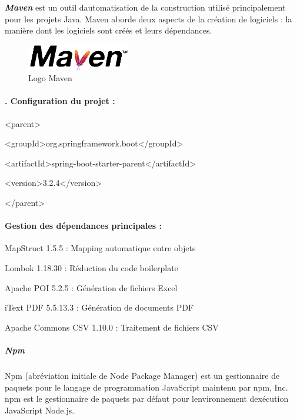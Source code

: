 \documentclass[12pt,a4paper,twoside]{report}
\begin{document}
\emph{\textbf{Maven}} est un outil d\textquotesingle automatisation de
la construction utilisé principalement pour les projets Java. Maven
aborde deux aspects de la création de logiciels : la manière dont les
logiciels sont créés et leurs dépendances.

\begin{figure}[H]
\centering
\includegraphics[width=0.4\textwidth]{latex_media/media/image27.png}
\caption{Logo Maven}
\label{fig:logo-maven}
\end{figure}

\hypertarget{configuration-du-projet}{%
\paragraph{. Configuration du projet :}\label{configuration-du-projet}}

\textless parent\textgreater{}

\textless groupId\textgreater org.springframework.boot\textless/groupId\textgreater{}

\textless artifactId\textgreater spring-boot-starter-parent\textless/artifactId\textgreater{}

\textless version\textgreater3.2.4\textless/version\textgreater{}

\textless/parent\textgreater{}

\hypertarget{gestion-des-duxe9pendances-principales}{%
\paragraph{Gestion des dépendances principales
:}\label{gestion-des-duxe9pendances-principales}}

MapStruct 1.5.5 : Mapping automatique entre objets

Lombok 1.18.30 : Réduction du code boilerplate

Apache POI 5.2.5 : Génération de fichiers Excel

iText PDF 5.5.13.3 : Génération de documents PDF

Apache Commons CSV 1.10.0 : Traitement de fichiers CSV

\hypertarget{npm}{%
\subparagraph{Npm}\label{npm}}

Npm (abréviation initiale de Node Package Manager) est un gestionnaire
de paquets pour le langage de programmation JavaScript maintenu par npm,
Inc. npm est le gestionnaire de paquets par défaut pour
l\textquotesingle environnement d\textquotesingle exécution JavaScript
Node.js.
\end{document}
